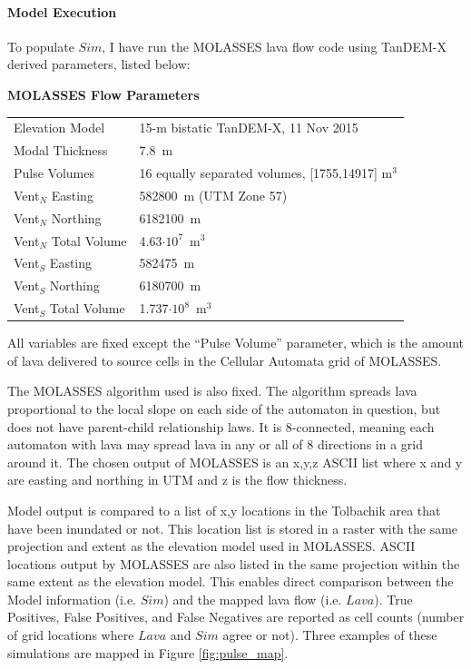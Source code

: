 \documentclass[12pt,letter]{article}
\begin{document}
\paragraph{Model Execution} To populate $Sim$, I have run the MOLASSES lava flow code using TanDEM-X derived parameters, listed below:
\begin{center}
	\textbf{MOLASSES Flow Parameters}\\
	\begin{tabular}{l l}
		\toprule
		Elevation Model & 15-m bistatic TanDEM-X, 11 Nov 2015\\
		Modal Thickness & 7.8~m\\
		Pulse Volumes & 16 equally separated volumes, [1755,14917] m$^3$\\
		\midrule
		Vent$_N$ Easting & 582800~m (UTM Zone 57)\\
		Vent$_N$ Northing & 6182100~m\\
		Vent$_N$ Total Volume & 4.63$\cdot10^7$~m$^3$\\
		\midrule
		Vent$_S$ Easting & 582475~m\\
		Vent$_S$ Northing & 6180700~m\\
		Vent$_S$ Total Volume & 1.737$\cdot10^8$~m$^3$\\
		\bottomrule
	\end{tabular}
\end{center}
All variables are fixed except the ``Pulse Volume'' parameter, which is the amount of lava delivered to source cells in the Cellular Automata grid of MOLASSES.

The MOLASSES algorithm used is also fixed. The algorithm spreads lava proportional to the local slope on each side of the automaton in question, but does not have parent-child relationship laws. It is 8-connected, meaning each automaton with lava may spread lava in any or all of 8 directions in a grid around it. The chosen output of MOLASSES is an x,y,z ASCII list where x and y are easting and northing in UTM and z is the flow thickness.

Model output is compared to a list of x,y locations in the Tolbachik area that have been inundated or not. This location list is stored in a raster with the same projection and extent as the elevation model used in MOLASSES. ASCII locations output by MOLASSES are also listed in the same projection within the same extent as the elevation model. This enables direct comparison between the Model information (i.e. $Sim$) and the mapped lava flow (i.e. $Lava$). True Positives, False Positives, and False Negatives are reported as cell counts (number of grid locations where $Lava$ and $Sim$ agree or not). Three examples of these simulations are mapped in Figure \ref{fig:pulse_map}.
\end{document}
